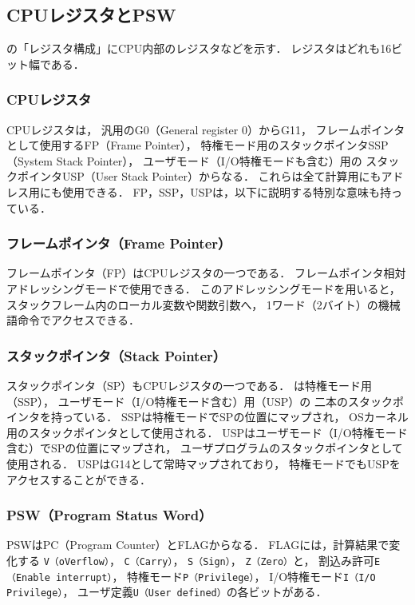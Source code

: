 \subsection{CPUレジスタとPSW}
の「レジスタ構成」にCPU内部のレジスタなどを示す．
レジスタはどれも16ビット幅である．

\subsubsection{CPUレジスタ}
CPUレジスタは，
汎用のG0（General register 0）からG11，
フレームポインタとして使用するFP（Frame Pointer），
特権モード用のスタックポインタSSP（System Stack Pointer），
ユーザモード（I/O特権モードも含む）用の
スタックポインタUSP（User Stack Pointer）からなる．
これらは全て計算用にもアドレス用にも使用できる．
FP，SSP，USPは，以下に説明する特別な意味も持っている．

\subsubsection{フレームポインタ（Frame Pointer）}
フレームポインタ（FP）はCPUレジスタの一つである．
フレームポインタ相対アドレッシングモードで使用できる．
このアドレッシングモードを用いると，
スタックフレーム内のローカル変数や関数引数へ，
1ワード（2バイト）の機械語命令でアクセスできる．

\subsubsection{スタックポインタ（Stack Pointer）}
スタックポインタ（SP）もCPUレジスタの一つである．
{\tac}は特権モード用（SSP），
ユーザモード（I/O特権モード含む）用（USP）の
二本のスタックポインタを持っている．
SSPは特権モードでSPの位置にマップされ，
OSカーネル用のスタックポインタとして使用される．
USPはユーザモード（I/O特権モード含む）でSPの位置にマップされ，
ユーザプログラムのスタックポインタとして使用される．
USPはG14として常時マップされており，
特権モードでもUSPをアクセスすることができる．

\subsubsection{PSW（Program Status Word）}
PSWはPC（Program Counter）とFLAGからなる．
FLAGには，計算結果で変化する
\texttt{V（oVerflow）}，
\texttt{C（Carry）}，
\texttt{S（Sign）}，
\texttt{Z（Zero）}と，
割込み許可\texttt{E（Enable interrupt）}，
特権モード\texttt{P（Privilege）}，
I/O特権モード\texttt{I（I/O Privilege）}，
ユーザ定義\texttt{U（User defined）}の各ビットがある．

